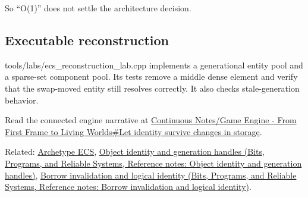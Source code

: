 So ``O(1)'' does not settle the architecture decision.

\subsection{Executable reconstruction}\label{appendix-8404d0b1a3e7-executable-reconstruction}

\hypertarget{appendix-8404d0b1a3e7-executable-reconstruction}{}

tools/labs/ecs\_reconstruction\_lab.cpp implements a generational entity pool and a sparse-set component pool. Its tests remove a middle dense element and verify that the swap-moved entity still resolves correctly. It also checks stale-generation behavior.

Read the connected engine narrative at \hyperref[05-engine-i-ch014-let-identity-survive-changes-in-storage]{Continuous Notes/Game Engine - From First Frame to Living Worlds\#Let identity survive changes in storage}.

Related: \hyperref[appendix-fbfeb0430008]{Archetype ECS}, \href{../01-Bits-Programs-and-Reliable-Systems/main.pdf\#nameddest=appendix-f1581457d322}{Object identity and generation handles (Bits, Programs, and Reliable Systems, Reference notes: Object identity and generation handles)}, \href{../01-Bits-Programs-and-Reliable-Systems/main.pdf\#nameddest=appendix-f9b8b9188c7f}{Borrow invalidation and logical identity (Bits, Programs, and Reliable Systems, Reference notes: Borrow invalidation and logical identity)}.
